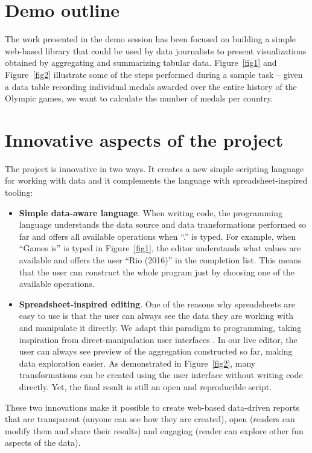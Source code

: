 \documentclass[sigconf,english]{acmart}
\begin{document}
\section{Demo outline}
The work presented in the demo session has been focused on building a simple web-based 
library that could be used by data journalists to present visualizations obtained by aggregating and 
summarizing tabular data. Figure~\ref{fig1} and Figure~\ref{fig2} illustrate some of the steps 
performed during a sample task -- given a data table recording individual medals awarded over the 
entire history of the Olympic games, we want to calculate the number of medals per country. 

\section{Innovative aspects of the project}
The project is innovative in two ways. It creates a new simple scripting language for working 
with data and it complements the language with spreadsheet-inspired tooling:

\begin{itemize}
\item \textbf{Simple data-aware language}. When writing code, the programming language understands 
  the data source and data transformations performed so far and offers all available operations when 
  ``.'' is typed. For example, when ``Games is'' is typed in Figure~\ref{fig1}, the editor understands 
  what values are available and offers the user ``Rio (2016)'' in the completion list. This means 
  that the user can construct the whole program just by choosing one of the available operations.
  
\item \textbf{Spreadsheet-inspired editing}. One of the reasons why spreadsheets are easy to use is 
  that the user can always see the data they are working with and manipulate it directly. We adapt 
  this paradigm to programming, taking inspiration from direct-manipulation user interfaces
  \cite{spreadsheetalgebra,querydirect,directman}. In our live editor, the user can always see preview of the 
  aggregation constructed so far, making data exploration easier. As demonstrated in Figure~\ref{fig2}, 
  many transformations can be created using the user interface without writing code directly. 
  Yet, the final result is still an open and reproducible script.
\end{itemize}
  
\noindent
These two innovations make it possible to create web-based data-driven reports that are transparent 
(anyone can see how they are created), open (readers can modify them and share their results) and 
engaging (reader can explore other fun aspects of the data).
\end{document}
